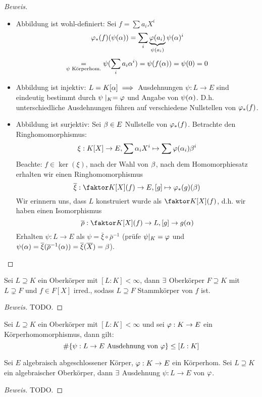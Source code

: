 \documentclass[a4paper]{report}
\begin{document}
\begin{proof}[Beweis]
  \begin{itemize}
    \item Abbildung ist wohl-definiert: Sei $f = \sum {a_{i}}X^{i}$
          \[\varphi_{*}(f)(\psi(\alpha)) = \sum_{i} \underbrace{\varphi(a_{i})}_{\psi(a_{i})} \psi(\alpha)^{i}\]
          \[\underset{ \psi \text{ Körperhom.}} = \psi(\sum_{i}a_{i}\alpha^{i}) = \psi(f(\alpha)) = \psi(0)=0\]
    \item Abbildung ist injektiv: $L = K[\alpha] \implies$ Ausdehnungen $\psi : L \to E$ sind eindeutig bestimmt durch $\psi \mid_{K} = \varphi$ und Angabe von $\psi(\alpha)$. D.h. unterschiedliche Ausdehnungen führen auf verschiedene Nullstellen von $\varphi_{*}(f)$.
    \item Abbildung ist surjektiv: Sei $\beta \in E$ Nullstelle von $\varphi_{*}(f)$. Betrachte den Ringhomomorphismus: \[\xi: K[X] \to E, \sum \alpha_{i}X^{i} \mapsto \sum \varphi(\alpha_{i})\beta^{i}\]
          Beachte: $f \in \ker(\xi)$, nach der Wahl von $\beta$, nach dem Homomorphiesatz erhalten wir einen Ringhomomorphismus
          \[\bar \xi : \fak{K[X]}{(f)} \to E, [g] \mps \ph_{*}(g)(\b)\]
          Wir erinnern uns, dass $L$ konstruiert wurde als $\fak {K[X]}{(f)}$, d.h. wir haben einen Isomorphismus \[\bar \rho : \fak {K[X]}{(f)} \to L, [g] \to g(\a)\]
          Erhalten $\psi : L \to E$ als $\psi = \bar \xi \circ \bar \rho ^{-1}$ (prüfe $\psi|_{K} = \varphi$ und $\psi (\alpha) = \overline \xi(\overline \rho^{-1}(\alpha)) = \overline \xi(\overline X) = \beta$). \qedhere
  \end{itemize}
\end{proof}

\begin{lemm}
  Sei $L \supseteq K$ ein Oberkörper mit $[L : K] < \infty$, dann $\exists$ Oberkörper $F \supseteq K$ mit $L \supsetneq F$ und $f \in F[X]$ irred., sodass $L \supseteq F$ Stammkörper von $f$ ist.
  \begin{proof}[Beweis]
TODO.
  \end{proof}
\end{lemm}
\begin{kor}
  Sei $L \supseteq K$ ein Oberkörper mit $[L : K] < \infty$ und sei $\varphi : K \to E$ ein Körperhomomorphismus, dann gilt:
  \[\#\{\psi : L \to E \text{ Ausdehnung von } \varphi\} \le [L : K]\]
\end{kor}

\begin{satz}
  Sei $E$ algebraisch abgeschlossener Körper, $\varphi :  K \to E$ ein Körperhom. Sei $L \supseteq K$ ein algebraischer Oberkörper, dann $\exists $ Ausdehnung $\psi : L \to E$ von $\varphi$.
  \begin{proof}[Beweis]
    TODO.
  \end{proof}
\end{satz}
\end{document}
